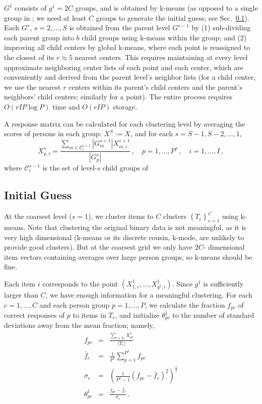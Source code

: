 \documentclass{article}
\newcommand{\cC}{\mathcal{C}}
\newcommand{\ta}{\theta}
\begin{document}
$G^1$ consists of $g^1 = 2C$ groups, and is obtained by k-means (as opposed to a single group in \cite{miniclustering}; we need at least $C$ groups to generate the initial guess; see Sec.~\ref{initial_guess}). Each $G^s$, $s=2,\dots,S$ is obtained from the parent level $G^{s-1}$ by (1) sub-dividing each parent group into $b$ child groups using k-means within the group; and (2) improving all child centers by global k-means, where each point is reassigned to the closest of its $r \approx 5$ nearest centers. This requires maintaining at every level approximate neighboring center lists of each point and each center, which are conveniently and derived from the parent level's neighbor lists (for a child center, we use the nearest $r$ centers within its parent's child centers and the parent's neighbors' child centers; similarly for a point). The entire process requires $O(r I P \log P)$ time and $O(r I P)$ storage.

A response matrix can be calculated for each clustering level by averaging the scores of persons in each group: $X^S := X$, and for each $s = S-1,S-2,\dots,1$,
\begin{equation}
	X^s_{p,i} = \frac{\sum_{m \in \cC^{s+1}_l} |G^{s+1}_m| X^{s+1}_{m,i}}{|G^s_p|}\,,
	\quad p=1,\dots,P^s\,,\quad i = 1,\dots,I\,,
	\label{x_averaging}
\end{equation}
where $\cC^{s-1}_l$ is the set of level-$s$ child groups of 

\subsection{Initial Guess}
\label{initial_guess}
At the coarsest level ($s=1$), we cluster items to $C$ clusters $\left\{T_c\right\}_{c=1}^C$ using k-means. Note that clustering the original binary data is not meaningful, as it is very high dimensional (k-means or its discrete cousin, k-mode, are unlikely to provide good clusters). But at the coarsest grid we only have $2C$- dimensional item vectors containing averages over large person groups, so k-means should be fine.

Each item $i$ corresponds to the point $(X^1_{1,i},\dots,X^1_{g^1,i})$. Since $g^1$ is sufficiently larger than $C$, we have enough information for a meaningful clustering. For each $c=1,\dots,C$ and each person group $p=1,\dots,P$, we calculate the fraction $f_{pc}$ of correct responses of $p$ to items in $T_c$, and initialize $\ta^1_{pc}$ to the number of standard deviations away from the mean fraction; namely,
\begin{eqnarray}
	f_{pc} &=& \frac{\sum_{i \in T_c} X^1_{pi}}{|T_c|} \\
	\bar{f}_c &=& \frac{1}{P^1} \sum_{p=1}^{P^1} f_{pc} \\
	\sigma_c &=& \left(\frac{1}{P^1-1} (f_{pc} - \bar{f}_c)^2 \right)^{\frac12} \\
	\ta^1_{pc} &=& \frac{f_{pc} - \bar{f}_c}{\sigma_c}\,.
	\label{coarsest_init}
\end{eqnarray}
\end{document}
